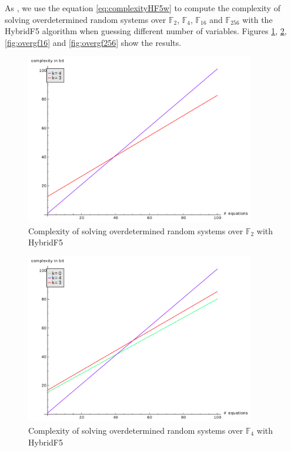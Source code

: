 As \cite{AlbrechtPetzoldt2013}, we use the equation \eqref{eq:complexityHF5w} to compute the complexity of solving overdetermined random systems over $\mathbb{F}_2$, $\mathbb{F}_4$, $\mathbb{F}_{16}$ and $\mathbb{F}_{256}$ with the HybridF5 algorithm when guessing different number of variables. Figures \ref{fig:overgf2}, \ref{fig:overgf4}, \ref{fig:overgf16} and \ref{fig:overgf256} show the results. 

\begin{figure}
\centering
\includegraphics[width=10cm]{figures/hybridF5_vs_m_gf2.pdf}
\caption{Complexity of solving overdetermined random systems over $\mathbb{F}_2$ with HybridF5}
\label{fig:overgf2}
\end{figure}

\begin{figure}
\centering
\includegraphics[width=10cm]{figures/hybridF5_vs_m_gf4.pdf}
\caption{Complexity of solving overdetermined random systems over $\mathbb{F}_4$ with HybridF5}
\label{fig:overgf4}
\end{figure}


